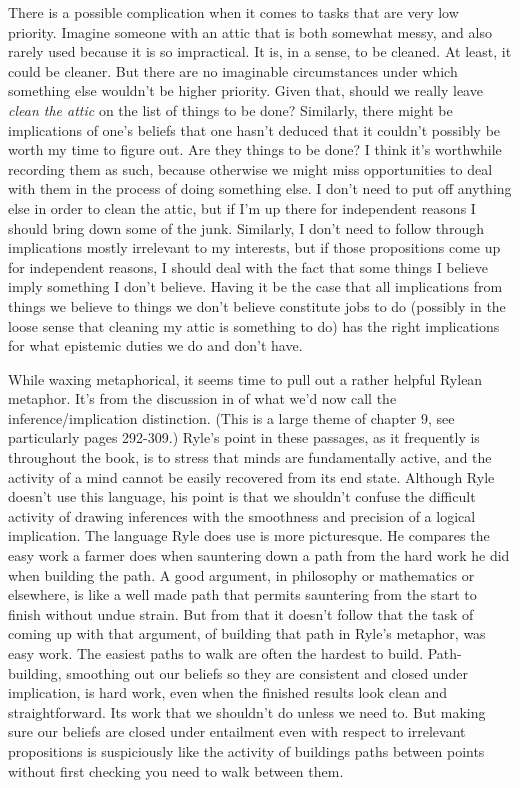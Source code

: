 \documentclass[11pt,]{book}
\begin{document}
There is a possible complication when it comes to tasks that are very low priority. Imagine someone with an attic that is both somewhat messy, and also rarely used because it is so impractical. It is, in a sense, to be cleaned. At least, it could be cleaner. But there are no imaginable circumstances under which something else wouldn't be higher priority. Given that, should we really leave \emph{clean the attic} on the list of things to be done? Similarly, there might be implications of one's beliefs that one hasn't deduced that it couldn't possibly be worth my time to figure out. Are they things to be done? I think it's worthwhile recording them as such, because otherwise we might miss opportunities to deal with them in the process of doing something else. I don't need to put off anything else in order to clean the attic, but if I'm up there for independent reasons I should bring down some of the junk. Similarly, I don't need to follow through implications mostly irrelevant to my interests, but if those propositions come up for independent reasons, I should deal with the fact that some things I believe imply something I don't believe. Having it be the case that all implications from things we believe to things we don't believe constitute jobs to do (possibly in the loose sense that cleaning my attic is something to do) has the right implications for what epistemic duties we do and don't have.

While waxing metaphorical, it seems time to pull out a rather helpful Rylean metaphor. It's from the discussion in \citet{Ryle1949} of what we'd now call the inference/implication distinction. (This is a large theme of chapter 9, see particularly pages 292-309.) Ryle's point in these passages, as it frequently is throughout the book, is to stress that minds are fundamentally active, and the activity of a mind cannot be easily recovered from its end state. Although Ryle doesn't use this language, his point is that we shouldn't confuse the difficult activity of drawing inferences with the smoothness and precision of a logical implication. The language Ryle does use is more picturesque. He compares the easy work a farmer does when sauntering down a path from the hard work he did when building the path. A good argument, in philosophy or mathematics or elsewhere, is like a well made path that permits sauntering from the start to finish without
undue strain. But from that it doesn't follow that the task of coming up with that argument, of building that path in Ryle's metaphor, was easy work. The easiest paths to walk are often the hardest to build. Path-building, smoothing out our beliefs so they are consistent and closed under implication, is hard work, even when the finished results look clean and straightforward. Its work that we shouldn't do unless we need to. But making sure our beliefs are closed under entailment even with respect to irrelevant propositions is suspiciously like the
activity of buildings paths between points without first checking you need to walk between them.
\end{document}
